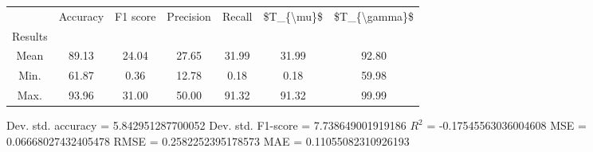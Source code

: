 \begin{tabular}{|c|c|c|c|c|c|c|}
\toprule
{} &  Accuracy &  F1 score &  Precision &  Recall &  \$T\_\{\textbackslash mu\}\$ &  \$T\_\{\textbackslash gamma\}\$ \\
Results &           &           &            &         &            &               \\
\hline
Mean    &     89.13 &     24.04 &      27.65 &   31.99 &      31.99 &         92.80 \\
Min.    &     61.87 &      0.36 &      12.78 &    0.18 &       0.18 &         59.98 \\
Max.    &     93.96 &     31.00 &      50.00 &   91.32 &      91.32 &         99.99 \\
\bottomrule
\end{tabular}

 Dev. std. accuracy = 5.842951287700052
 Dev. std. F1-score = 7.738649001919186
 $R^2$ = -0.17545563036004608
 MSE = 0.06668027432405478
 RMSE = 0.2582252395178573
 MAE = 0.11055082310926193